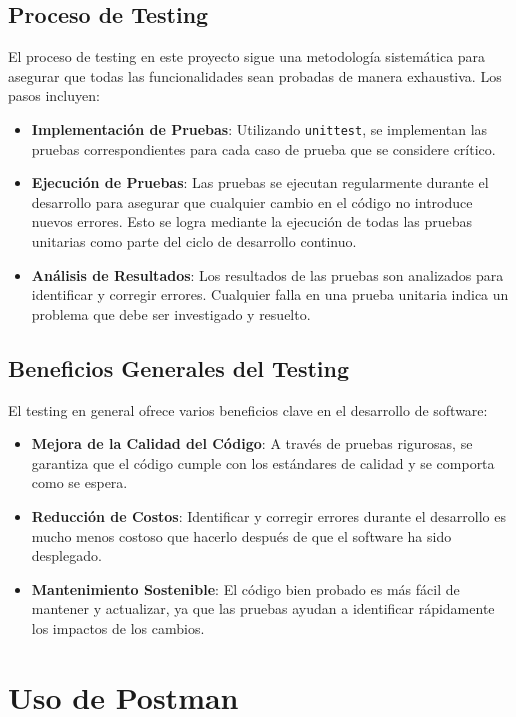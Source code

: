 \subsection{Proceso de Testing}
El proceso de testing en este proyecto sigue una metodología sistemática para asegurar que todas las funcionalidades sean probadas de manera exhaustiva. Los pasos incluyen:

\begin{itemize}
    \item \textbf{Implementación de Pruebas}: Utilizando \texttt{unittest}, se implementan las pruebas correspondientes para cada caso de prueba que se considere crítico.
    \item \textbf{Ejecución de Pruebas}: Las pruebas se ejecutan regularmente durante el desarrollo para asegurar que cualquier cambio en el código no introduce nuevos errores. Esto se logra mediante la ejecución de todas las pruebas unitarias como parte del ciclo de desarrollo continuo.
    \item \textbf{Análisis de Resultados}: Los resultados de las pruebas son analizados para identificar y corregir errores. Cualquier falla en una prueba unitaria indica un problema que debe ser investigado y resuelto.
\end{itemize}

\subsection{Beneficios Generales del Testing}
El testing en general ofrece varios beneficios clave en el desarrollo de software:
\begin{itemize}
    \item \textbf{Mejora de la Calidad del Código}: A través de pruebas rigurosas, se garantiza que el código cumple con los estándares de calidad y se comporta como se espera.
    \item \textbf{Reducción de Costos}: Identificar y corregir errores durante el desarrollo es mucho menos costoso que hacerlo después de que el software ha sido desplegado.
    \item \textbf{Mantenimiento Sostenible}: El código bien probado es más fácil de mantener y actualizar, ya que las pruebas ayudan a identificar rápidamente los impactos de los cambios.
\end{itemize}


\section{Uso de Postman}

